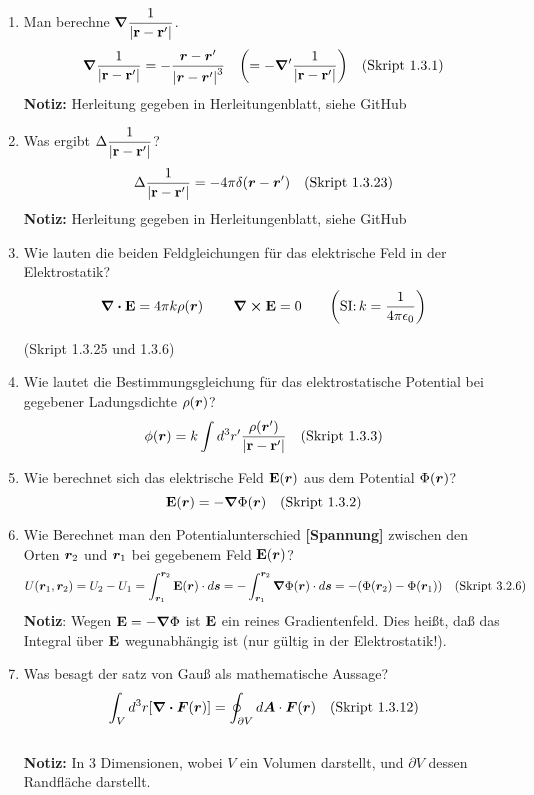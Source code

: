 \begin{enumerate}
  \item Man berechne $\displaystyle \grad\frac{1}{\abs{\vb{r}-\vb{r}'}}$. %
        $$\displaystyle \grad\frac{1}{\abs{\vb{r}-\vb{r}'}}=
         -\frac{\vb* r -\vb* r'}{\abs{\vb* r - \vb* r'}^3}\quad
         \qty(=-\grad'\frac{1}{\abs{\vb{r}-\vb{r}'}})\quad\text{(Skript 1.3.1)}$$ 
    \textbf{Notiz:} Herleitung gegeben in Herleitungenblatt, siehe GitHub

  \item Was ergibt $\displaystyle \Delta\frac{1}{\abs{\vb{r}-\vb{r}'}}$? %
        $$\displaystyle \Delta \frac{1}{\abs{\vb{r}-\vb{r}'}} = -4\pi \delta(\vb* r-\vb* r')
        \quad\text{(Skript 1.3.23)}$$
    \textbf{Notiz:} Herleitung gegeben in Herleitungenblatt, siehe GitHub
    
  \item Wie lauten die beiden Feldgleichungen für das %
        elektrische Feld in der Elektrostatik?
        $$\displaystyle \div \vb E=4\pi k\rho(\vb* r)\,\qquad\curl\vb E=0
         \qquad\qty(\text{SI:}\,k=\frac{1}{4\pi\epsilon_0})$$
        \begin{center}
          (Skript 1.3.25 und 1.3.6)
        \end{center}
  
  \item Wie lautet die Bestimmungsgleichung für das elektrostatische %
        Potential bei gegebener Ladungsdichte $\rho(\vb* r)$?
        $$\phi(\vb* r)=k\int d^3r'\frac{\rho(\vb* r')}{\abs{\vb{r}-\vb{r}'}}
        \quad\text{(Skript 1.3.3)}$$

  \item Wie berechnet sich das elektrische Feld $\vb E (\vb* r)$ aus dem %
        Potential $\Phi(\vb* r)$?
        $$\displaystyle \vb E(\vb* r) = - \grad \Phi (\vb* r)
        \quad\text{(Skript 1.3.2)}$$

  \item Wie Berechnet man den Potentialunterschied \textbf{[Spannung]} %
        zwischen den Orten 
        $\vb* r_2$ und $\vb* r_1$ bei gegebenem Feld $\vb E(\vb* r)$?
        $$\displaystyle U(\vb* r_1, \vb* r_2)=U_2-U_1
         =\int_{\vb* r_1}^{\vb* r_2} \vb E(\vb* r)\cdot d\vb* s
         =-\int_{\vb* r_1}^{\vb* r_2} \grad \Phi (\vb* r)\cdot d\vb* s
         =-\qty(\Phi(\vb* r_2)-\Phi(\vb* r_1))
         \quad\text{(Skript 3.2.6)}$$
        \textbf{Notiz}: Wegen $\vb E=-\grad\Phi$ ist $\vb E$ ein reines
        Gradientenfeld. Dies heißt, daß das Integral über $\vb E$
        wegunabhängig ist (nur gültig in der Elektrostatik!).

  \item Was besagt der satz von Gauß als mathematische Aussage? %
        $$\displaystyle \int_V d^3r \qty[\div \vb* F(\vb* r)]=
         \oint_{\partial V}d\vb* A\cdot \vb* F(\vb* r)
         \quad\text{(Skript 1.3.12)}$$\\
        \textbf{Notiz:} In 3 Dimensionen, wobei $V$ ein Volumen darstellt,
        und $\partial V$ dessen Randfläche darstellt.


\end{enumerate}
